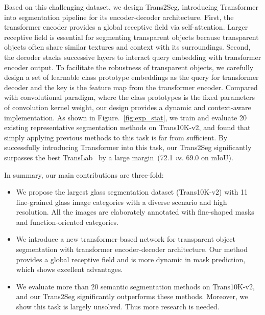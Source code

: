 \documentclass{article}
\begin{document}
Based on this challenging dataset, we design Trans2Seg, introducing Transformer into segmentation pipeline for its encoder-decoder architecture. First, the transformer encoder provides a global receptive field via self-attention. Larger receptive field is essential for segmenting transparent objects because transparent objects often share similar textures and context with its surroundings. 
Second, the decoder stacks successive layers to interact query embedding with transformer encoder output. To facilitate the robustness of transparent objects, we carefully design a set of learnable class prototype embeddings as the query for transformer decoder and the key is the feature map from the transformer encoder. Compared with convolutional paradigm, where the class prototypes is the fixed parameters of convolution kernel weight, our design provides a dynamic and context-aware implementation. 
As shown in Figure.~\ref{fig:exp_stat}, we train and evaluate 20 existing representative segmentation methods on Trans10K-v2, and found that simply applying previous methods to this task is far from sufficient. By successfully introducing Transformer into this task, our Trans2Seg significantly surpasses the best TransLab~\cite{translab} by a large margin~(72.1 \textit{vs.} 69.0 on mIoU).

In summary, our main contributions are three-fold:
\begin{itemize}
\item We propose the largest glass segmentation dataset (Trans10K-v2) with 11 fine-grained glass image categories with a diverse scenario and high resolution. All the images are elaborately annotated with fine-shaped masks and function-oriented categories.
\item
We introduce a new transformer-based network for transparent object segmentation with transformer encoder-decoder architecture. Our method provides a global receptive field and is more dynamic in mask prediction, which shows excellent advantages.
\item
We evaluate more than 20 semantic segmentation methods on Trans10K-v2, and our Trans2Seg significantly outperforms these methods. Moreover, we show this task is largely unsolved. Thus more research is needed.
\end{itemize}
\end{document}
